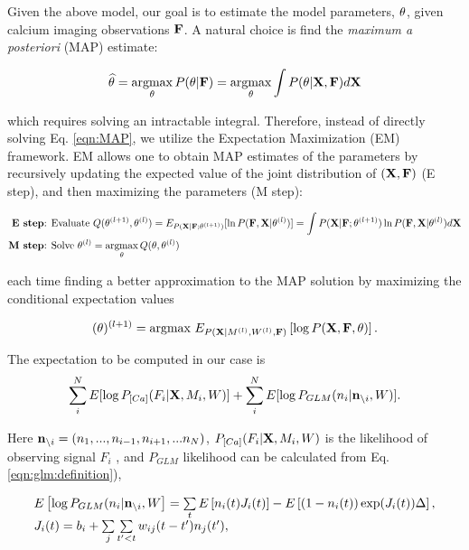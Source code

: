 Given the above model, our goal is to estimate the model parameters, $\mathbf{\theta}$, given calcium imaging observations ${\bf F}$. A natural choice is find the \emph{maximum a posteriori} (MAP) estimate:

\begin{equation}\label{eqn:MAP}
\widehat{\mathbf{\theta}}=\operatorname*{argmax}_{\mathbf{\theta}} P(\mathbf{\theta}| {\bf F}) = \operatorname*{argmax}_{\mathbf{\theta}} \int P(\mathbf{\theta}| {\bf X}, {\bf F}) d{\bf X}
\end{equation}

\noindent which requires solving an intractable integral. Therefore, instead of directly solving Eq. \eqref{eqn:MAP}, we utilize the Expectation Maximization (EM) framework. EM allows one to obtain MAP estimates of the parameters by recursively updating the expected value of the joint distribution of $({\bf X}, {\bf F})$ (E step), and then maximizing the parameters (M step):

\begin{align}
\textbf{E step} &\text{: Evaluate } Q(\mathbf{\theta}^{(l+1)},\mathbf{\theta}^{(l)}) = E_{P({\bf X} | {\bf F}; \mathbf{\theta}^{(l+1)})}[ \ln P({\bf F}, {\bf X} | \mathbf{\theta}^{(l)})] = \int P({\bf X} | {\bf F}; \mathbf{\theta}^{(l+1)}) \ln P({\bf F}, {\bf X} | \mathbf{\theta}^{(l)}) d {\bf X}  \\
\textbf{M step} &\text{: Solve } \mathbf{\theta}^{(l)} = \operatorname*{argmax}_{\mathbf{\theta}} Q(\mathbf{\theta},\mathbf{\theta}^{(l)})  
\end{align}

  each time finding a better approximation to the MAP solution by maximizing the conditional expectation values

\begin{equation}
(\mathbf{\theta})^{(l+1)}=\text{argmax }E_{P({\bf X}|M^{(l)}, W^{(l)}, {\bf F})}\left[\log P({\bf X}, {\bf F}, \mathbf{\theta})\right].
\end{equation}

The expectation to be computed in our case is
\begin{equation}\label{eqn:loglik:definition-expl}
\sum_i^N E[\log P_{[Ca]}(F_i|{\bf X}, M_i, W)] + \sum_i^N E[\log P_{GLM}(n_i|{\bf n}_{\backslash i}, W)].
\end{equation}

Here ${\bf n}_{\backslash i}=(n_1, ..., n_{i-1}, n_{i+1}, ...n_N)$, $P_{[Ca]}(F_i|{\bf X}, M_i, W)$ is the likelihood of observing signal $F_i$ \cite{Vogelstein2009}, and $P_{GLM}$ likelihood can be calculated from Eq. \eqref{eqn:glm:definition}), 

\begin{equation}\label{eqn:likelihoodGLM-expl}
\begin{array}{l}
E\left[\log P_{GLM}(n_i|{\bf n}_{\backslash i}, W\right]=\sum\limits_t E \left[ n_i(t) J_i(t)\right] - E\left[(1-n_i(t)) \exp(J_i(t)) \Delta \right], \\
J_i(t)=b_i+\sum\limits_{j} \sum\limits_{t'<t} w_{ij}(t-t')n_{j}(t'), 
\end{array}
\end{equation}

